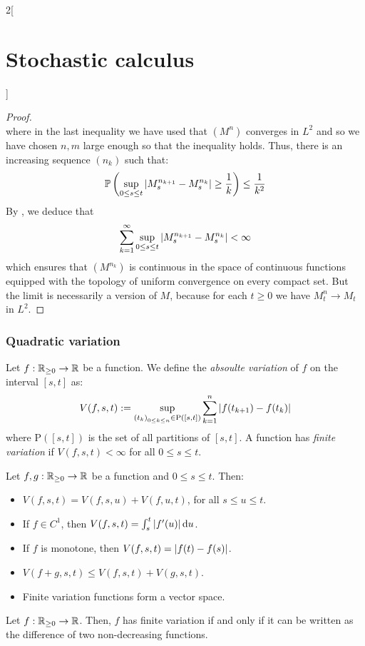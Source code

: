 \documentclass[../../../main_math.tex]{subfiles}
\begin{document}
\begin{multicols}{2}[\section{Stochastic calculus}]
\begin{proof}
$$    $$
    where in the last inequality we have used that ${(M^n)}$ converges in $L^2$ and so we have chosen $n,m$ large enough so that the inequality holds. Thus, there is an increasing sequence $(n_k)$ such that:
    $$
      \mathbb{P}\left(\sup_{0\leq s\leq t}\abs{M_s^{n_{k+1}}-M_s^{n_k}}\geq \frac{1}{k}\right)\leq \frac{1}{k^2}
    $$
    By , we deduce that
    $$
      \sum_{k=1}^{\infty}\sup_{0\leq s\leq t}\abs{M_s^{n_{k+1}}-M_s^{n_k}}<\infty
    $$
    which ensures that $(M^{n_k})$ is continuous in the space of continuous functions equipped with the topology of uniform convergence on every compact set. But the limit is necessarily a version of $M$, because for each $t\geq 0$ we have $M_t^n\to M_t$ in $L^2$.
  \end{proof}
  \subsubsection{Quadratic variation}
  \begin{definition}
    Let $f:\mathbb{R}_{\geq 0}\to\mathbb{R}$ be a function. We define the \emph{absoulte variation} of $f$ on the interval $[s,t]$ as:
    $$
      V(f,s,t):=\sup_{{(t_k)}_{0\leq k\leq n}\in \mathrm{P}([s,t])}\sum_{k=1}^{n}\abs{f(t_{k+1})-f(t_k)}
    $$
    where $\mathrm{P}([s,t])$ is the set of all partitions of $[s,t]$. A function has \emph{finite variation} if $V(f,s,t)<\infty$ for all $0\leq s\leq t$.
  \end{definition}
  \begin{lemma}\label{SC:properties_variation}
    Let $f,g:\mathbb{R}_{\geq 0}\to\mathbb{R}$ be a function and $0\leq s\leq t$. Then:
    \begin{itemize}
      \item $V(f,s,t)=V(f,s,u)+V(f,u,t)$, for all $s\leq u\leq t$.
      \item If $f\in C^1$, then $V(f,s,t)=\int_s^t\abs{f'(u)}\dd{u}$.
      \item If $f$ is monotone, then $V(f,s,t)=\abs{f(t)-f(s)}$.
      \item $\displaystyle V(f+g,s,t)\leq V(f,s,t)+V(g,s,t)$.
      \item Finite variation functions form a vector space.
    \end{itemize}
  \end{lemma}
  \begin{proposition}\label{SC:difference_of_increasing}
    Let $f:\mathbb{R}_{\geq 0}\to\mathbb{R}$. Then, $f$ has finite variation if and only if it can be written as the difference of two non-decreasing functions.

\end{proposition}
\end{multicols}
\end{document}
